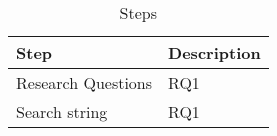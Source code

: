 \begin{table}[htb]
	\centering
	\caption{Steps}  
	\begin{tabular}{| l | p{2in} |} 
    	\hline
        \bf Step & \bf Description \\
		\hline  
		Research Questions & RQ1 \\
		\hline   
        Search string  & RQ1 \\
		\hline 
	\end{tabular}
    \label{Summary}
\end{table}


